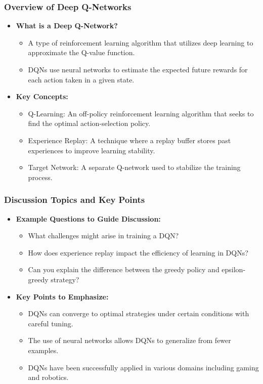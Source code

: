 \documentclass[aspectratio=169]{beamer}
\begin{document}
\begin{frame}[fragile]
    \frametitle{Overview of Deep Q-Networks}
    \begin{itemize}
        \item \textbf{What is a Deep Q-Network?}
        \begin{itemize}
            \item A type of reinforcement learning algorithm that utilizes deep learning to approximate the Q-value function.
            \item DQNs use neural networks to estimate the expected future rewards for each action taken in a given state.
        \end{itemize}
        \item \textbf{Key Concepts:}
        \begin{itemize}
            \item Q-Learning: An off-policy reinforcement learning algorithm that seeks to find the optimal action-selection policy.
            \item Experience Replay: A technique where a replay buffer stores past experiences to improve learning stability.
            \item Target Network: A separate Q-network used to stabilize the training process.
        \end{itemize}
    \end{itemize}
\end{frame}

\begin{frame}[fragile]
    \frametitle{Discussion Topics and Key Points}
    \begin{itemize}
        \item \textbf{Example Questions to Guide Discussion:}
        \begin{itemize}
            \item What challenges might arise in training a DQN?
            \item How does experience replay impact the efficiency of learning in DQNs?
            \item Can you explain the difference between the greedy policy and epsilon-greedy strategy?
        \end{itemize}
        \item \textbf{Key Points to Emphasize:}
        \begin{itemize}
            \item DQNs can converge to optimal strategies under certain conditions with careful tuning.
            \item The use of neural networks allows DQNs to generalize from fewer examples.
            \item DQNs have been successfully applied in various domains including gaming and robotics.
        \end{itemize}
    \end{itemize}
\end{frame}
\end{document}
